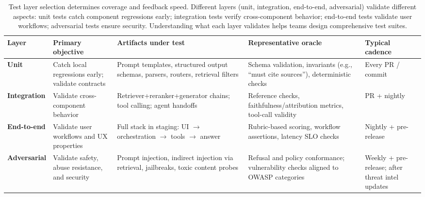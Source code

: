 \begin{table}[t]
\centering
\caption{Test layer selection determines coverage and feedback speed. Different layers (unit, integration, end-to-end, adversarial) validate different aspects: unit tests catch component regressions early; integration tests verify cross-component behavior; end-to-end tests validate user workflows; adversarial tests ensure security. Understanding what each layer validates helps teams design comprehensive test suites.}
\label{tab:ch10_test_layers}
\small
\setlength{\tabcolsep}{6pt}
\renewcommand{\arraystretch}{1.3}
\begin{tabularx}{\linewidth}{@{}p{2.1cm}X X X p{2.0cm}@{}}
\toprule
\rowcolor{gray!15}
\textbf{Layer} & \textbf{Primary objective} & \textbf{Artifacts under test} & \textbf{Representative oracle} & \textbf{Typical cadence} \\
\midrule
\rowcolor{green!10}
\textbf{Unit} &
Catch local regressions early; validate contracts &
Prompt templates, structured output schemas, parsers, routers, retrieval filters &
Schema validation, invariants (e.g., ``must cite sources''), deterministic checks &
Every PR / commit \\
\midrule
\rowcolor{blue!8}
\textbf{Integration} &
Validate cross-component behavior &
Retriever+reranker+generator chains; tool calling; agent handoffs &
Reference checks, faithfulness/attribution metrics, tool-call validity &
PR + nightly \\
\midrule
\rowcolor{orange!10}
\textbf{End-to-end} &
Validate user workflows and UX properties &
Full stack in staging: UI $\rightarrow$ orchestration $\rightarrow$ tools $\rightarrow$ answer &
Rubric-based scoring, workflow assertions, latency SLO checks &
Nightly + pre-release \\
\midrule
\rowcolor{red!8}
\textbf{Adversarial} &
Validate safety, abuse resistance, and security &
Prompt injection, indirect injection via retrieval, jailbreaks, toxic content probes &
Refusal and policy conformance; vulnerability checks aligned to OWASP categories &
Weekly + pre-release; after threat intel updates \\
\bottomrule
\end{tabularx}
\end{table}

